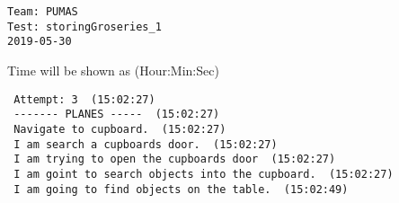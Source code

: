\documentclass{article}
\begin{document}
\begin{center}
\begingroup
\fontsize{16pt}{17pt}\selectfont
\begin{BVerbatim}
Team: PUMAS
Test: storingGroseries_1
2019-05-30
\end{BVerbatim}
\endgroup 
\end{center}
\begingroup
\fontsize{9pt}{9pt}\selectfont
\begin{quoting}[indentfirst=true]
\hspace*{\fill} Time will be shown as (Hour:Min:Sec)\\
\end{quoting}
\endgroup
\verb| Attempt: 3  (15:02:27) |\\
\verb| ------- PLANES -----  (15:02:27) |\\
\verb| Navigate to cupboard.  (15:02:27) |\\
\verb| I am search a cupboards door.  (15:02:27) |\\
\verb| I am trying to open the cupboards door  (15:02:27) |\\
\verb| I am goint to search objects into the cupboard.  (15:02:27) |\\
\verb| I am going to find objects on the table.  (15:02:49) |\\
\end{document}
